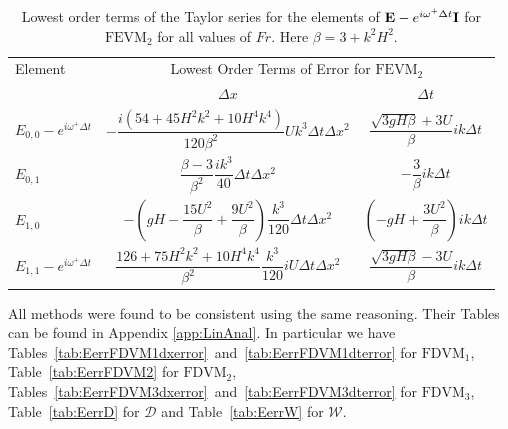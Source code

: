 \begin{table}
	\centering
	\begin{tabular}{l c c}
		\hline 
		Element & \multicolumn{2}{c}{Lowest Order Terms of Error for $\text{FEVM}_2$}\T \B  \\
		  \cline{2-3}
		& $\Delta x$&$\Delta t$\T \B  \\
		\hline
		$E_{0,0} -  e^{i \omega^+ \Delta t} $& $ -\dfrac{i \left(54 + 45H^2k^2 + 10H^4k^4\right)}{120\beta^2} U k^3 \Delta t \Delta x^2$ & $\dfrac{\sqrt{3gH \beta} + 3U}{\beta} ik \Delta t$ \T \B  \\
		$E_{0,1}$& $ \dfrac{\beta - 3}{\beta^2} \dfrac{ik^3}{40} \Delta  t\Delta x^2$ &  $ - \dfrac{3}{\beta} ik\Delta t$ \T \B  \\
		$E_{1,0}$& $ -\left(gH - \dfrac{15U^2}{\beta} + \dfrac{9U^2}{\beta}\right)  \dfrac{k^3}{120}\Delta t\Delta x^2$ &  $ \left(-gH + \dfrac{3U^2}{\beta}\right)ik \Delta t$ \T \B  \\
		$E_{1,1} -  e^{i \omega^+ \Delta t}$& $ \dfrac{126 + 75H^2 k^2 + 10 H^4 k^4}{\beta^2} \dfrac{k^3}{120} i U \Delta t\Delta x^2$ & $\dfrac{\sqrt{3gH \beta} - 3U}{\beta} ik \Delta t$ \T \B  \\\hline
	\end{tabular}
	\caption{Lowest order terms of the Taylor series for the elements of $\mathbf{E} - e^{i \omega^+ \Delta t} \mathbf{I}$ for $\text{FEVM}_2$ for all values of $Fr$. Here $\beta = 3 + k^2 H^2$.}
	\label{tab:EerrFEVM2} 
\end{table}

All methods were found to be consistent using the same reasoning. Their Tables can be found in Appendix \ref{app:LinAnal}. In particular we have Tables~\ref{tab:EerrFDVM1dxerror}~and~\ref{tab:EerrFDVM1dterror} for $\text{FDVM}_1$, Table~\ref{tab:EerrFDVM2} for $\text{FDVM}_2$, Tables~\ref{tab:EerrFDVM3dxerror}~and~\ref{tab:EerrFDVM3dterror} for $\text{FDVM}_3$, Table~\ref{tab:EerrD} for $\mathcal{D}$ and Table~\ref{tab:EerrW} for $\mathcal{W}$. 

